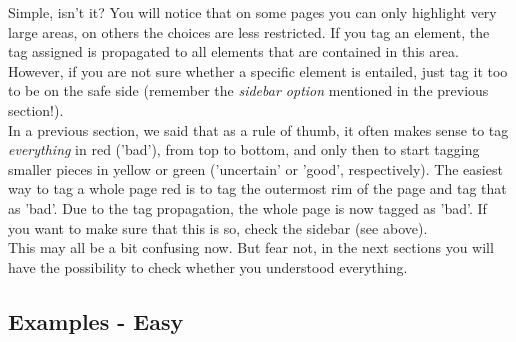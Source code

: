 \documentclass[12pt,a4paper]{article}
\begin{document}
Simple, isn't it? You will notice that on some pages you can only highlight very large areas, on others the choices are less restricted. If you tag an element, the tag assigned is propagated to all elements that are contained in this area. However, if you are not sure whether a specific element is entailed, just tag it too to be on the safe side (remember the \emph{sidebar option} mentioned in the previous section!).\\

In a previous section, we said that as a rule of thumb, it often makes sense to tag \emph{everything} in red ('bad'), from top to bottom, and only then to start tagging smaller pieces in yellow or green ('uncertain' or 'good', respectively). The easiest way to tag a whole page red is to tag the outermost rim of the page and tag that as 'bad'. Due to the tag propagation, the whole page is now tagged as 'bad'. If you want to make sure that this is so, check the sidebar (see above).\\

This may all be a bit confusing now. But fear not, in the next sections you will have the possibility to check whether you understood everything. \\


\subsection{Examples - Easy}
\label{Examples}
\end{document}
